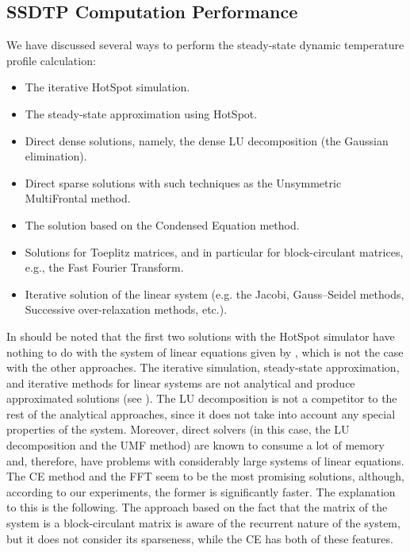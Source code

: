 \subsection{SSDTP Computation Performance} \label{sec:results-ssdtp}
We have discussed several ways to perform the steady-state dynamic temperature profile calculation:
\begin{itemize}
  \item The iterative HotSpot simulation.
  \item The steady-state approximation using HotSpot.
  \item Direct dense solutions, namely, the dense LU decomposition (the Gaussian elimination).
  \item Direct sparse solutions with such techniques as the Unsymmetric MultiFrontal method.
  \item The solution based on the Condensed Equation method.
  \item Solutions for Toeplitz matrices, and in particular for block-circulant matrices, e.g., the Fast Fourier Transform.
  \item Iterative solution of the linear system (e.g. the Jacobi, Gauss–Seidel methods, Successive over-relaxation methods, etc.).
\end{itemize}

In should be noted that the first two solutions with the HotSpot simulator have nothing to do with the system of linear equations given by , which is not the case with the other approaches. The iterative simulation, steady-state approximation, and iterative methods for linear systems are not analytical and produce approximated solutions (see ). The LU decomposition is not a competitor to the rest of the analytical approaches, since it does not take into account any special properties of the system. Moreover, direct solvers (in this case, the LU decomposition and the UMF method) are known to consume a lot of memory and, therefore, have problems with considerably large systems of linear equations. The CE method and the FFT seem to be the most promising solutions, although, according to our experiments, the former is significantly faster. The explanation to this is the following. The approach based on the fact that the matrix of the system is a block-circulant matrix is aware of the recurrent nature of the system, but it does not consider its sparseness, while the CE has both of these features.

